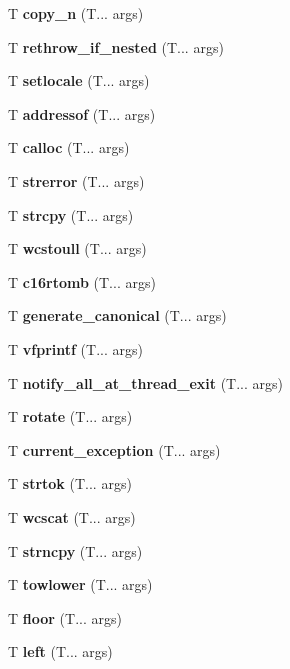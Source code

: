 \begin{DoxyCompactItemize}
\mbox{\label{copy_n}} 
T \textbf{ copy\+\_\+n} (T... args)
\item 
\mbox{\label{rethrow_if_nested}} 
T \textbf{ rethrow\+\_\+if\+\_\+nested} (T... args)
\item 
\mbox{\label{setlocale}} 
T \textbf{ setlocale} (T... args)
\item 
\mbox{\label{addressof}} 
T \textbf{ addressof} (T... args)
\item 
\mbox{\label{calloc}} 
T \textbf{ calloc} (T... args)
\item 
\mbox{\label{strerror}} 
T \textbf{ strerror} (T... args)
\item 
\mbox{\label{strcpy}} 
T \textbf{ strcpy} (T... args)
\item 
\mbox{\label{wcstoul}} 
T \textbf{ wcstoull} (T... args)
\item 
\mbox{\label{c16rtomb}} 
T \textbf{ c16rtomb} (T... args)
\item 
\mbox{\label{generate_canonical}} 
T \textbf{ generate\+\_\+canonical} (T... args)
\item 
\mbox{\label{vfprintf}} 
T \textbf{ vfprintf} (T... args)
\item 
\mbox{\label{notify_all_at_thread_exit}} 
T \textbf{ notify\+\_\+all\+\_\+at\+\_\+thread\+\_\+exit} (T... args)
\item 
\mbox{\label{rotate}} 
T \textbf{ rotate} (T... args)
\item 
\mbox{\label{current_exception}} 
T \textbf{ current\+\_\+exception} (T... args)
\item 
\mbox{\label{strtok}} 
T \textbf{ strtok} (T... args)
\item 
\mbox{\label{wcscat}} 
T \textbf{ wcscat} (T... args)
\item 
\mbox{\label{strncpy}} 
T \textbf{ strncpy} (T... args)
\item 
\mbox{\label{towlower}} 
T \textbf{ towlower} (T... args)
\item 
\mbox{\label{floor}} 
T \textbf{ floor} (T... args)
\item 
\mbox{\label{left}} 
T \textbf{ left} (T... args)

\end{DoxyCompactItemize}
